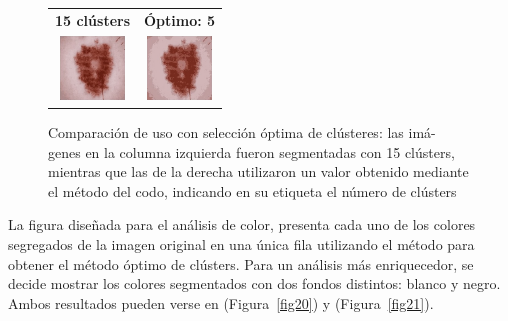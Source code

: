 \begin{figure}[h]
\begin{tabular}{cc}
	\textbf{15 clústers} & \textbf{Óptimo: 5} \\
	\includegraphics[width=1.7cm]{images/F19-I.jpg} & 
    \includegraphics[width=1.7cm]{images/F19-J.jpg} \\
\end{tabular}
\caption{Comparación de uso con selección óptima de clústeres: las imá- genes en la columna izquierda fueron segmentadas con 15 clústers, mientras que las de la derecha utilizaron un valor obtenido mediante el método del codo, indicando en su etiqueta el número de clústers}  
\label{fig19} 
\end{figure}

La figura diseñada para el análisis de color, presenta cada uno de los colores segregados de la imagen original en una única fila utilizando el método para obtener el método óptimo de clústers. Para un análisis más enriquecedor, se decide mostrar los colores segmentados con dos fondos distintos: blanco y negro. Ambos resultados pueden verse en   (Figura~\ref{fig20}) y (Figura~\ref{fig21}). 

